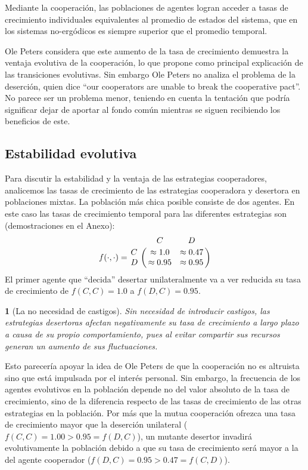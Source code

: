 \documentclass[a4paper,10pt]{article}
\newif\ifen
\newif\ifes
\newcommand{\en}[1]{\ifen#1\fi}
\newcommand{\es}[1]{\ifes#1\fi}
\newtheorem{conclution}{\en{Conclution}\es{Conclusión}}%
\begin{document}
Mediante la cooperación, las poblaciones de agentes logran acceder a tasas de crecimiento individuales equivalentes al promedio de estados del sistema, que en los sistemas no-ergódicos es siempre superior que el promedio temporal.

Ole Peters considera que este aumento de la tasa de crecimiento demuestra la ventaja evolutiva de la cooperación, lo que propone como principal explicación de las transiciones evolutivas.
Sin embargo Ole Peters no analiza el problema de la deserción, quien dice ``our cooperators are unable to break the cooperative pact''.
No parece ser un problema menor, teniendo en cuenta la tentación que podría significar dejar de aportar al fondo común mientras se siguen recibiendo los beneficios de este.

\subsection{Estabilidad evolutiva}

Para discutir la estabilidad y la ventaja de las estrategias cooperadores, analicemos las tasas de crecimiento de las estrategias cooperadora y desertora en poblaciones mixtas.
La población más chica posible consiste de dos agentes.
En este caso las tasas de crecimiento temporal para las diferentes estrategias son (demostraciones en el Anexo):
%
\begin{equation}
   f(\cdot,\cdot) = \bordermatrix{ & C & D \cr
      C & \approx 1.0 & \approx 0.47 \cr
      D & \approx 0.95 & \approx 0.95 } 
\end{equation}
%
El primer agente que ``decida'' desertar unilateralmente va a ver reducida su tasa de crecimiento de $f(C,C) = 1.0$ a $ f(D,C) = 0.95$.
% 
\begin{conclution}[La no necesidad de castigos]
Sin necesidad de introducir castigos, las estrategias desertoras afectan negativamente su tasa de crecimiento a largo plazo a causa de su propio comportamiento, pues al evitar compartir sus recursos generan un aumento de sus fluctuaciones.
\end{conclution}
Esto parecería apoyar la idea de Ole Peters de que la cooperación no es altruista sino que está impulsada por el interés personal.
Sin embargo, la frecuencia de los agentes evolutivos en la población depende no del valor absoluto de la tasa de crecimiento, sino de la diferencia respecto de las tasas de crecimiento de las otras estrategias en la población.
Por más que la mutua cooperación ofrezca una tasa de crecimiento mayor que la deserción unilateral ($f(C,C) = 1.00 > 0.95 = f(D,C)$), un mutante desertor invadirá evolutivamente la población debido a que su tasa de crecimiento será mayor a la del agente cooperador ($f(D,C) = 0.95 > 0.47 = f(C,D)$). 
\end{document}
